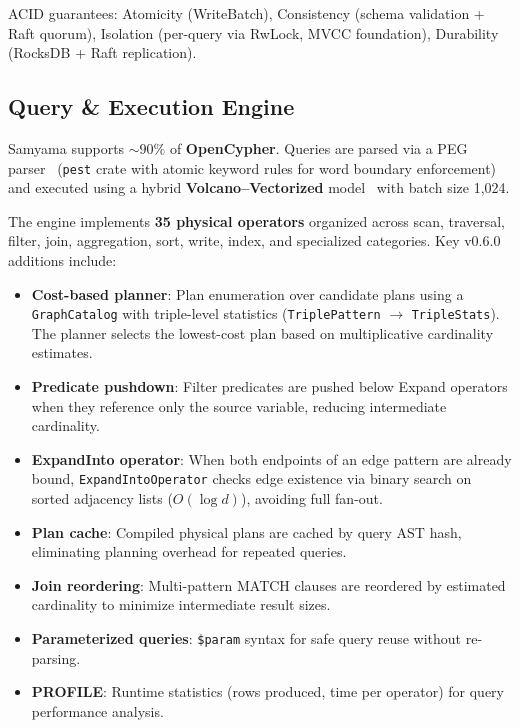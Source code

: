 \documentclass[11pt]{article}
\begin{document}
ACID guarantees: Atomicity (WriteBatch), Consistency (schema validation + Raft quorum), Isolation (per-query via RwLock, MVCC foundation), Durability (RocksDB + Raft replication).

\subsection{Query \& Execution Engine}
\label{sec:query-engine}

Samyama supports ${\sim}90\%$ of \textbf{OpenCypher}. Queries are parsed via a PEG parser~\citep{ford2004peg} (\texttt{pest} crate with atomic keyword rules for word boundary enforcement) and executed using a hybrid \textbf{Volcano--Vectorized} model~\citep{graefe1994volcano} with batch size 1,024.

The engine implements \textbf{35 physical operators} organized across scan, traversal, filter, join, aggregation, sort, write, index, and specialized categories. Key v0.6.0 additions include:

\begin{itemize}[leftmargin=*]
  \item \textbf{Cost-based planner}: Plan enumeration over candidate plans using a \texttt{GraphCatalog} with triple-level statistics (\texttt{TriplePattern} $\to$ \texttt{TripleStats}). The planner selects the lowest-cost plan based on multiplicative cardinality estimates.
  \item \textbf{Predicate pushdown}: Filter predicates are pushed below Expand operators when they reference only the source variable, reducing intermediate cardinality.
  \item \textbf{ExpandInto operator}: When both endpoints of an edge pattern are already bound, \texttt{ExpandIntoOperator} checks edge existence via binary search on sorted adjacency lists ($O(\log d)$), avoiding full fan-out.
  \item \textbf{Plan cache}: Compiled physical plans are cached by query AST hash, eliminating planning overhead for repeated queries.
  \item \textbf{Join reordering}: Multi-pattern MATCH clauses are reordered by estimated cardinality to minimize intermediate result sizes.
  \item \textbf{Parameterized queries}: \texttt{\$param} syntax for safe query reuse without re-parsing.
  \item \textbf{PROFILE}: Runtime statistics (rows produced, time per operator) for query performance analysis.
\end{itemize}
\end{document}
